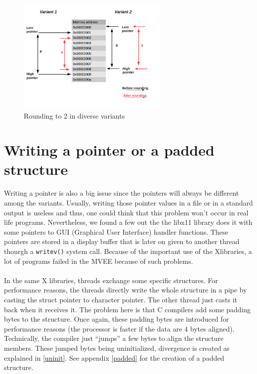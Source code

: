 \documentclass[english]{enstaPRE}
\begin{document}
\begin{figure}[t, centering]
 \centerline{\includegraphics[width=0.65\textwidth]{RoundUpMemory}}
 \caption{Rounding to 2 in diverse variants}
 \label{fig:rounding}
\end{figure}



\section{Writing a pointer or a padded structure}

Writing a pointer is also a big issue since the pointers will always be different among the variants.
Usually, writing those pointer values in a file or in a standard output is useless and thus, one could think that this problem won't occur in
real life programs. Nevertheless, we found a few out the the libx11 library does it with some pointers to GUI 
(Graphical User Interface) handler functions. These pointers are stored in a display buffer that is later on given to another thread 
thourgh a \texttt{writev()} system call.
Because of the important use of the Xlibraries, a lot of programs failed in the MVEE because of such problems.
\\ \\
In the same X libraries, threads exchange some specific structures. For performance reasons, the threads directly write the whole 
structure in a pipe by casting the struct pointer to character pointer. The other thread just casts it back when it receives it.
The problem here is that C compilers add some padding bytes to the structure. Once again, these padding bytes are introduced for performance
reasons (the processor is faster if the data are 4 bytes aligned). Technically, the compiler just ``jumps'' a few bytes to align 
the structure members. These jumped bytes being uninitialized, divergence is created as explained in \ref{uninit}.  
See appendix \ref{padded} for the creation of a padded structure.
\end{document}
